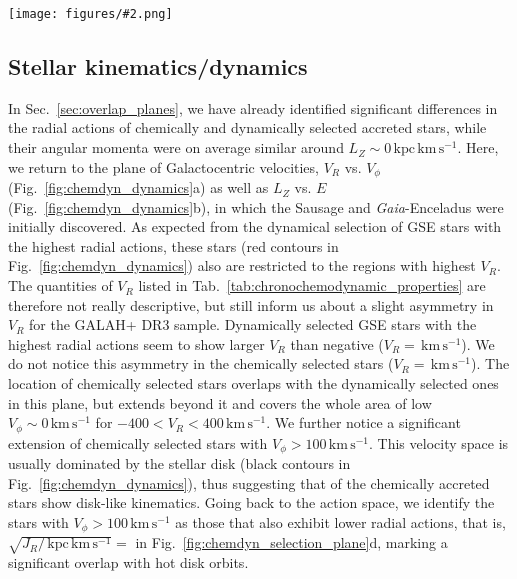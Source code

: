 \documentclass[fleqn,usenatbib]{mnras}
\newcommand{\kms}{\,\mathrm{km\,s^{-1}}}	%
\newcommand{\kpckms}{\,\mathrm{kpc\,km\,s^{-1}}}	%
\newcommand{\Gaia}{\textit{Gaia}\xspace} %
\newcommand{\codeicon}{{\faCloudDownload}}
\newcommand{\codelink}[1]{\href{https://github.com/svenbuder/Accreted-stars-in-GALAH-DR3/tree/main/figures/#1.ipynb}{\codeicon}\,\,}
\newcommand{\oscaption}[2]{\caption{#2 \codelink{#1}}}
\newcommand{\figuretextwidth}[4]{\begin{figure*} \centering \texttt{[image: figures/\#2.png]}\oscaption{#3}{#4}\label{fig:#2} \end{figure*}}
\begin{document}
\figuretextwidth{17cm}{chemdyn_dynamics}{chronochemodynamic_comparison}{
\textbf{Comparison of kinematic properties (Galactocentric velocities $V_R$ vs. $V_\phi$) as well as dynamic properties ($L_Z$, $E$, and $e$) for stars selected as accreted ones by means of chemistry (orange) and dynamics (red).} Black contours/lines denote the overall GALAH+ DR3 sample (mainly disk stars).
}

\subsection{Stellar kinematics/dynamics} \label{sec:gse_stellar_dynamics}

In Sec.~\ref{sec:overlap_planes}, we have already identified significant differences in the radial actions of chemically and dynamically selected accreted stars, while their angular momenta were on average similar around $L_Z \sim 0 \kpckms$. Here, we return to the plane of Galactocentric velocities, $V_R$ vs. $V_\phi$ (Fig.~\ref{fig:chemdyn_dynamics}a) as well as $L_Z$ vs. $E$ (Fig.~\ref{fig:chemdyn_dynamics}b), in which the Sausage \citep{Belokurov2018} and \Gaia-Enceladus \citep{Helmi2018} were initially discovered. As expected from the dynamical selection of GSE stars with the highest radial actions, these stars (red contours in Fig.~\ref{fig:chemdyn_dynamics}) also are restricted to the regions with highest $V_R$. The quantities of $V_R$ listed in Tab.~\ref{tab:chronochemodynamic_properties} are therefore not really descriptive, but still inform us about a slight asymmetry in $V_R$ for the GALAH+ DR3 sample. Dynamically selected GSE stars with the highest radial actions seem to show larger $V_R$ than negative ($V_R=$$\kms$). We do not notice this asymmetry in the chemically selected stars ($V_R=$$\kms$). The location of chemically selected stars overlaps with the dynamically selected ones in this plane, but extends beyond it and covers the whole area of low $V_\phi \sim 0 \kms$ for $-400 < V_R < 400\kms$. We further notice a significant extension of  chemically selected stars with $V_\phi > 100 \kms$. This velocity space is usually dominated by the stellar disk (black contours in Fig.~\ref{fig:chemdyn_dynamics}), thus suggesting that  of the chemically accreted stars show disk-like kinematics. Going back to the action space, we identify the stars with $V_\phi > 100 \kms$ as those that also exhibit lower radial actions, that is, $\sqrt{J_R / \kpckms} = $ in Fig.~\ref{fig:chemdyn_selection_plane}d, marking a significant overlap with hot disk orbits.
\end{document}
